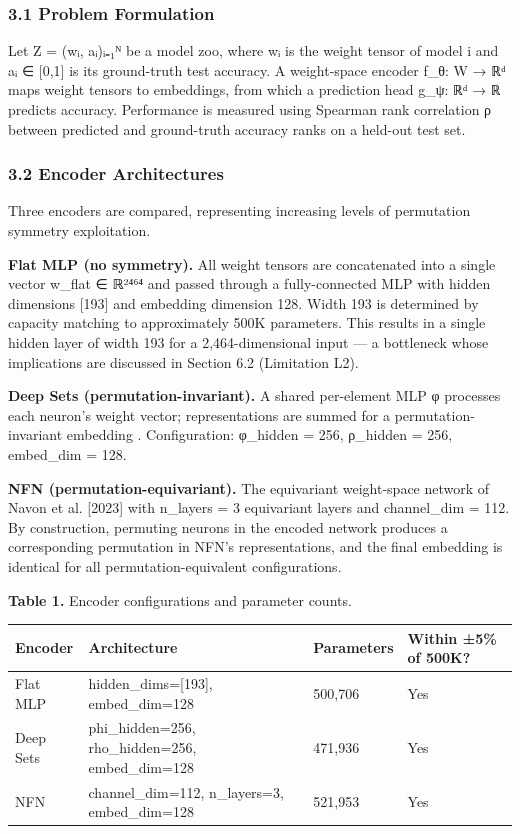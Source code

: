 
\subsubsection{3.1 Problem Formulation}

Let Z = {(wᵢ, aᵢ)}ᵢ₌₁ᴺ be a model zoo, where wᵢ is the weight tensor of model i and aᵢ ∈ [0,1] is its ground-truth test accuracy. A weight-space encoder f_θ: W → ℝᵈ maps weight tensors to embeddings, from which a prediction head g_ψ: ℝᵈ → ℝ predicts accuracy. Performance is measured using Spearman rank correlation ρ between predicted and ground-truth accuracy ranks on a held-out test set.

\subsubsection{3.2 Encoder Architectures}

Three encoders are compared, representing increasing levels of permutation symmetry exploitation.

\textbf{Flat MLP (no symmetry).} All weight tensors are concatenated into a single vector w_flat ∈ ℝ²⁴⁶⁴ and passed through a fully-connected MLP with hidden dimensions [193] and embedding dimension 128. Width 193 is determined by capacity matching to approximately 500K parameters. This results in a single hidden layer of width 193 for a 2,464-dimensional input — a bottleneck whose implications are discussed in Section 6.2 (Limitation L2).

\textbf{Deep Sets (permutation-invariant).} A shared per-element MLP φ processes each neuron's weight vector; representations are summed for a permutation-invariant embedding \citep{Zaheeretal2017}. Configuration: φ_hidden = 256, ρ_hidden = 256, embed_dim = 128.

\textbf{NFN (permutation-equivariant).} The equivariant weight-space network of Navon et al. [2023] with n_layers = 3 equivariant layers and channel_dim = 112. By construction, permuting neurons in the encoded network produces a corresponding permutation in NFN's representations, and the final embedding is identical for all permutation-equivalent configurations.

\textbf{Table 1.} Encoder configurations and parameter counts.

\begin{table}[htbp]
\centering
\begin{tabular}{llll}
\toprule
Encoder & Architecture & Parameters & Within ±5\% of 500K? \\
\midrule
Flat MLP & hidden_dims=[193], embed_dim=128 & 500,706 & Yes \\
Deep Sets & phi_hidden=256, rho_hidden=256, embed_dim=128 & 471,936 & Yes \\
NFN & channel_dim=112, n_layers=3, embed_dim=128 & 521,953 & Yes \\
\bottomrule
\end{tabular}
\end{table}

